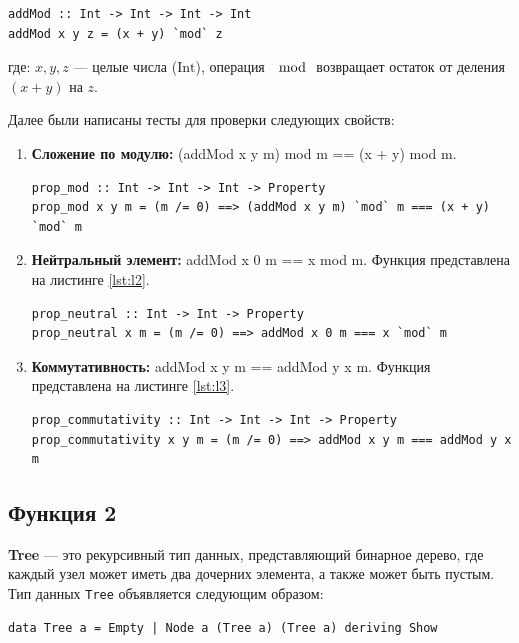 \documentclass[11pt,a4paper,final]{article} %
\begin{document}
\begin{lstlisting}[caption={Функция вычисления суммы двух чисел по модулю третьего числа}, label={lst:l1}]
addMod :: Int -> Int -> Int -> Int
addMod x y z = (x + y) `mod` z
\end{lstlisting}

где: $x, y, z$ — целые числа ($\text{Int}$), операция $\mod$ возвращает остаток от деления $(x + y)$ на $z$.

Далее были написаны тесты для проверки следующих свойств:
\begin{enumerate}
\item \textbf{Сложение по модулю:} (addMod x y m) mod m == (x + y) mod m.

\begin{lstlisting}[caption={Код теста №1}, label={lst:l2}]
prop_mod :: Int -> Int -> Int -> Property
prop_mod x y m = (m /= 0) ==> (addMod x y m) `mod` m === (x + y) `mod` m  
\end{lstlisting}

\item \textbf{ Нейтральный элемент:} addMod x 0 m == x mod m.
Функция представлена на листинге \ref{lst:l2}.

\begin{lstlisting}[caption={Код теста для нейтрального элемента}, label={lst:l2}]
prop_neutral :: Int -> Int -> Property
prop_neutral x m = (m /= 0) ==> addMod x 0 m === x `mod` m
\end{lstlisting}

\item \textbf{Коммутативность:} addMod x y m == addMod y x m.
Функция представлена на листинге \ref{lst:l3}.
\begin{lstlisting}[caption={Код теста для коммутативности}, label={lst:l3}]
prop_commutativity :: Int -> Int -> Int -> Property
prop_commutativity x y m = (m /= 0) ==> addMod x y m === addMod y x m
\end{lstlisting}
\end{enumerate}

\subsection{Функция 2}

\textbf{Tree} — это рекурсивный тип данных, представляющий бинарное дерево, где каждый узел может иметь два дочерних элемента, а также может быть пустым. Тип данных \texttt{Tree} объявляется следующим образом:

\begin{lstlisting}[caption={Объявление типа данных Tree}, label={lst:l1}]
data Tree a = Empty | Node a (Tree a) (Tree a) deriving Show
\end{lstlisting}
\end{document}
